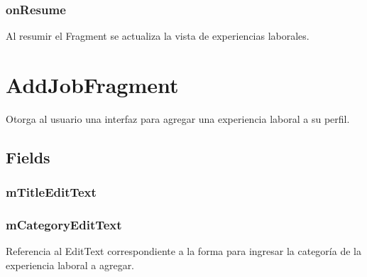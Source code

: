 \documentclass[letterpaper,10pt,english]{sphinxmanual}
\begin{document}
\subsubsection{onResume}
\label{Fragments/JobsFragment:onresume}

\begin{fulllineitems}
\label{Fragments/JobsFragment:com.fiuba.tallerii.jobify.JobsFragment.onResume()}
Al resumir el Fragment se actualiza la vista de experiencias laborales.

\end{fulllineitems}



\section{AddJobFragment}
\label{Fragments/AddJobFragment:addjobfragment}\label{Fragments/AddJobFragment::doc}

\begin{fulllineitems}
\label{Fragments/AddJobFragment:com.fiuba.tallerii.jobify.AddJobFragment}
Otorga al usuario una interfaz para agregar una experiencia laboral a su perfil.

\end{fulllineitems}



\subsection{Fields}
\label{Fragments/AddJobFragment:fields}

\subsubsection{mTitleEditText}
\label{Fragments/AddJobFragment:mtitleedittext}

\subsubsection{mCategoryEditText}
\label{Fragments/AddJobFragment:mcategoryedittext}

\begin{fulllineitems}
\label{Fragments/AddJobFragment:com.fiuba.tallerii.jobify.AddJobFragment.mCategoryEditText}
Referencia al EditText correspondiente a la forma para ingresar la categoría de la experiencia laboral a agregar.

\end{fulllineitems}
\end{document}
